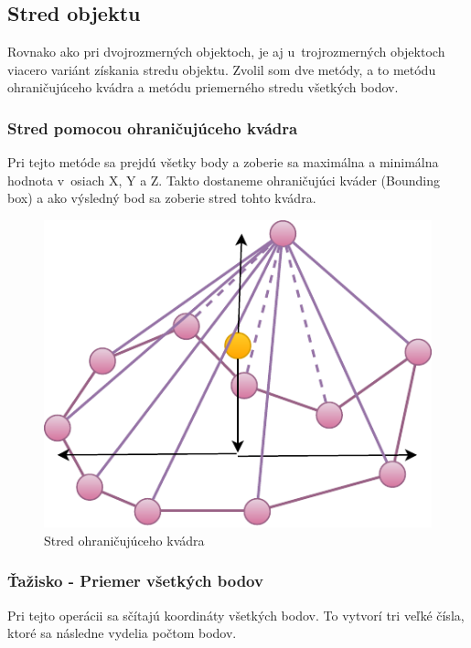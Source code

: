 \subsection*{Stred objektu}

Rovnako ako pri dvojrozmerných objektoch, je aj u~trojrozmerných objektoch viacero variánt získania stredu objektu. Zvolil som dve metódy, a to metódu ohraničujúceho kvádra a metódu priemerného stredu všetkých bodov.


\subsubsection{Stred pomocou ohraničujúceho kvádra}
Pri tejto metóde sa prejdú všetky body a zoberie sa maximálna a minimálna hodnota v~osiach X, Y a Z. Takto dostaneme ohraničujúci kváder (Bounding box) a ako výsledný bod sa zoberie stred tohto kvádra.
		
\begin{figure}[H]
	\centering
	\includegraphics[height=0.3\textwidth]{obrazky-figures/Diagram/Draw/1Points/DP Navrh operacii-0D - PointMiddle of 3D object.pdf}
	\caption{Stred ohraničujúceho kvádra}
	\label{fig:PointMiddle of 3D object}
\end{figure}

\subsubsection{Ťažisko - Priemer všetkých bodov} 
Pri tejto operácii sa sčítajú koordináty všetkých bodov. To vytvorí tri veľké čísla, ktoré sa následne vydelia počtom bodov.










